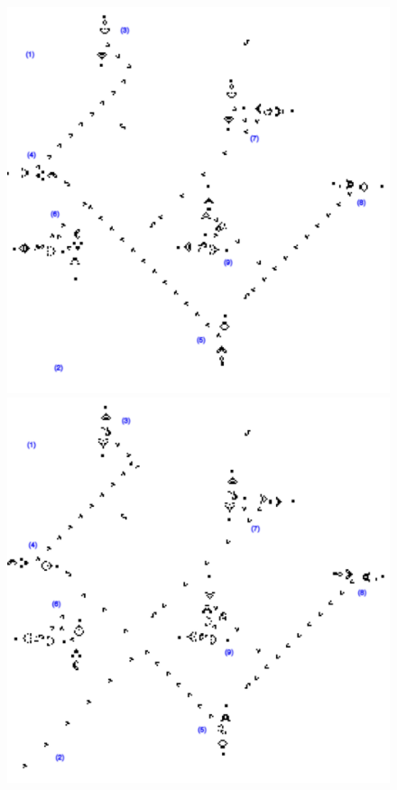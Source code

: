 \documentclass{article}
\theoremstyle{definition}
\theoremstyle{plain}
\theoremstyle{plain}
\begin{document}
\begin{figure}[H]
  \centering
  \begin{minipage}{0.45\textwidth}
    \centering
    \includegraphics[width=\linewidth]{figures/andNoGo12.png} %
  \end{minipage}\hfill
  \begin{minipage}{0.45\textwidth}
    \centering
    \includegraphics[width=\linewidth]{figures/andNoGo1.png} %
  \end{minipage}


\end{figure}
\end{document}
